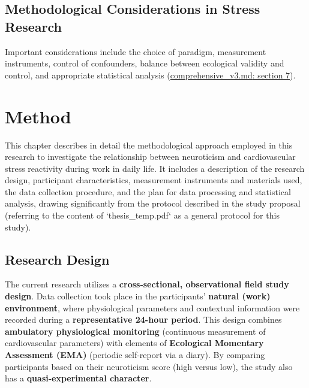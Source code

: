 \documentclass[11pt, a4paper]{report}
\newcommand{\mdcitesec}[2]{\href{run:./sources/#1}{\url{#1}: section #2}}
\begin{document}
\section{Methodological Considerations in Stress Research}
\label{sec:methodological_considerations_stress} %
Important considerations include the choice of paradigm, measurement instruments, control of confounders, balance between ecological validity and control, and appropriate statistical analysis (\mdcitesec{comprehensive_v3.md}{7}).
\chapter{Method}
\label{ch:method}

This chapter describes in detail the methodological approach employed in this research to investigate the relationship between neuroticism and cardiovascular stress reactivity during work in daily life. It includes a description of the research design, participant characteristics, measurement instruments and materials used, the data collection procedure, and the plan for data processing and statistical analysis, drawing significantly from the protocol described in the study proposal \cite{ThesisTempPDF} (referring to the content of `thesis_temp.pdf` as a general protocol for this study).

\section{Research Design}
\label{sec:research_design_method} %

The current research utilizes a \textbf{cross-sectional, observational field study design}. Data collection took place in the participants' \textbf{natural (work) environment}, where physiological parameters and contextual information were recorded during a \textbf{representative 24-hour period}. This design combines \textbf{ambulatory physiological monitoring} (continuous measurement of cardiovascular parameters) with elements of \textbf{Ecological Momentary Assessment (EMA)} (periodic self-report via a diary). By comparing participants based on their neuroticism score (high versus low), the study also has a \textbf{quasi-experimental character}.
\end{document}
